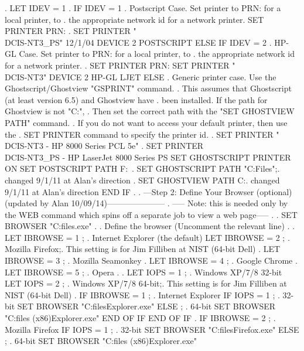 .
LET IDEV = 1
.
IF IDEV = 1
   . Postscript Case.  Set printer to PRN: for a local printer, to
   . the appropriate network id for a network printer.
   SET PRINTER PRN:
   . SET PRINTER "\\DCIS-NT3_PS"  12/1/04
   DEVICE 2 POSTSCRIPT
ELSE IF IDEV = 2
   . HP-GL Case.  Set printer to PRN: for a local printer, to
   . the appropriate network id for a network printer.
   . SET PRINTER PRN:
   SET PRINTER "\\DCIS-NT3"
   DEVICE 2 HP-GL LJET
ELSE
  . Generic printer case.  Use the Ghostscript/Ghostview "GSPRINT" command.
  . This assumes that Ghostscript (at least version 6.5) and Ghostview have
  . been installed.  If the path for Ghostview is not "C:\Ghostgum\Gsview",
  . Then set the correct path with the "SET GHOSTVIEW PATH" command.
  . If you do not want to access your default printer, then use the
  . SET PRINTER command to specify the printer id.
  . SET PRINTER "\\DCIS-NT3 - HP 8000 Series PCL 5e"
  . SET PRINTER \\DCIS-NT3_PS - HP LaserJet 8000 Series PS
  SET GHOSTSCRIPT PRINTER ON
  SET POSTSCRIPT PATH F:\GHOSTGUM\GSVIEW\
  . SET GHOSTSCRIPT PATH "C:\Program Files\gs{}";. changed 9/1/11 at Alan's direction
  . SET GHOSTVIEW PATH C:\GHOSTGUM\GSVIEW\;.            changed 9/1/11 at Alan's direction
END IF
.
. ---Step 2: Define Your Browser (optional) (updated by Alan 10/09/14)---------------------
. -----        Note: this is needed only by the    WEB   command which spins off a separate job to view a web page-----
.
. SET BROWSER "C:\program files\netscape\navigator\program\netscape.exe"
.
. Define the browser (Uncomment the relevant line)
.
. LET IBROWSE = 1 ; . Internet Explorer (the default)
LET IBROWSE = 2 ; . Mozilla Firefox;. This setting is for Jim Filliben at NIST (64-bit Dell)
. LET IBROWSE = 3 ; . Mozilla Seamonkey
. LET IBROWSE = 4 ; . Google Chrome
. LET IBROWSE = 5 ; . Opera
.
. LET IOPS = 1 ; . Windows XP/7/8 32-bit
LET IOPS = 2 ; . Windows XP/7/8 64-bit;. This setting is for Jim Filliben at NIST (64-bit Dell)
.
IF IBROWSE = 1  ; . Internet Explorer
   IF IOPS = 1  ; . 32-bit
     SET BROWSER "C:\program files\Internet Explorer\iexplore.exe"
   ELSE         ; . 64-bit
     SET BROWSER "C:\program files (x86)\Internet Explorer\iexplore.exe"
   END OF IF
END OF IF
.
IF IBROWSE = 2  ; . Mozilla Firefox
   IF IOPS = 1  ; . 32-bit
     SET BROWSER "C:\program files\Mozilla Firefox\firefox.exe"
   ELSE         ; . 64-bit
     SET BROWSER "C:\program files (x86)\Internet Explorer\iexplore.exe"
